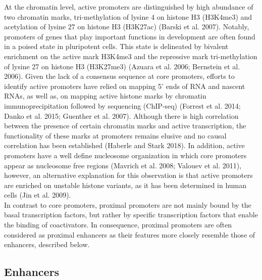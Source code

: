 At the chromatin level, active promoters are distinguished by high abundance of two chromatin marks, tri-methylation of lysine 4 on histone H3 (H3K4me3) and acetylation of lysine 27 on histone H3 (H3K27ac) (Barski et al. 2007). Notably, promoters of genes that play important functions in development are often found in a poised state in pluripotent cells. This state is delineated by bivalent enrichment on the active mark H3K4me3 and the repressive mark tri-methylation of lysine 27 on histone H3 (H3K27me3) (Azuara et al. 2006; Bernstein et al. 2006). Given the lack of a consensus sequence at core promoters, efforts to identify active promoters have relied on mapping 5’ ends of RNA and nascent RNAs, as well as, on mapping active histone marks by chromatin immunoprecipitation followed by sequencing (ChIP-seq) (Forrest et al. 2014; Danko et al. 2015; Guenther et al. 2007). Although there is high correlation between the presence of certain chromatin marks and active transcription, the functionality of these marks at promoters remains elusive and no causal correlation has been established (Haberle and Stark 2018). In addition, active promoters have a well define nucleosome organization in which core promoters appear as nucleosome free regions (Mavrich et al. 2008; Valouev et al. 2011), however, an alternative explanation for this observation is that active promoters are enriched on unstable histone variants, as it has been determined in human cells (Jin et al. 2009).\\

In contrast to core promoters, proximal promoters are not mainly bound by the basal transcription factors, but rather by specific transcription factors that enable the binding of coactivators. In consequence, proximal promoters are often considered as proximal enhancers as their features more closely resemble those of enhancers, described below.\\

		\subsection{Enhancers}

